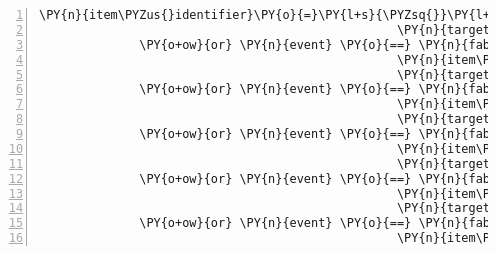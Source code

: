 \begin{Verbatim}[commandchars=\\\{\},numbers=left,firstnumber=1,stepnumber=1]
                                                  \PY{n}{item\PYZus{}identifier}\PY{o}{=}\PY{l+s}{\PYZsq{}}\PY{l+s}{goblet}\PY{l+s}{\PYZsq{}}\PY{p}{,}
                                                  \PY{n}{target\PYZus{}identifier}\PY{o}{=}\PY{l+s}{\PYZsq{}}\PY{l+s}{teleport\PYZus{}room\PYZus{}kuni}\PY{l+s}{\PYZsq{}}\PY{p}{)}
              \PY{o+ow}{or} \PY{n}{event} \PY{o}{==} \PY{n}{fabula}\PY{o}{.}\PY{n}{TriesToDropEvent}\PY{p}{(}\PY{n}{identifier}\PY{o}{=}\PY{n}{ID\PYZus{}KUNI}\PY{p}{,}
                                                  \PY{n}{item\PYZus{}identifier}\PY{o}{=}\PY{l+s}{\PYZsq{}}\PY{l+s}{goblet\PYZus{}filled}\PY{l+s}{\PYZsq{}}\PY{p}{,}
                                                  \PY{n}{target\PYZus{}identifier}\PY{o}{=}\PY{l+s}{\PYZsq{}}\PY{l+s}{teleport\PYZus{}room\PYZus{}cassandra}\PY{l+s}{\PYZsq{}}\PY{p}{)}
              \PY{o+ow}{or} \PY{n}{event} \PY{o}{==} \PY{n}{fabula}\PY{o}{.}\PY{n}{TriesToDropEvent}\PY{p}{(}\PY{n}{identifier}\PY{o}{=}\PY{n}{ID\PYZus{}KUNI}\PY{p}{,}
                                                  \PY{n}{item\PYZus{}identifier}\PY{o}{=}\PY{l+s}{\PYZsq{}}\PY{l+s}{goblet\PYZus{}filled}\PY{l+s}{\PYZsq{}}\PY{p}{,}
                                                  \PY{n}{target\PYZus{}identifier}\PY{o}{=}\PY{l+s}{\PYZsq{}}\PY{l+s}{teleport\PYZus{}room\PYZus{}kuni}\PY{l+s}{\PYZsq{}}\PY{p}{)}
              \PY{o+ow}{or} \PY{n}{event} \PY{o}{==} \PY{n}{fabula}\PY{o}{.}\PY{n}{TriesToDropEvent}\PY{p}{(}\PY{n}{identifier}\PY{o}{=}\PY{n}{ID\PYZus{}KUNI}\PY{p}{,}
                                                  \PY{n}{item\PYZus{}identifier}\PY{o}{=}\PY{l+s}{\PYZsq{}}\PY{l+s}{dew}\PY{l+s}{\PYZsq{}}\PY{p}{,}
                                                  \PY{n}{target\PYZus{}identifier}\PY{o}{=}\PY{l+s}{\PYZsq{}}\PY{l+s}{teleport\PYZus{}room\PYZus{}cassandra}\PY{l+s}{\PYZsq{}}\PY{p}{)}
              \PY{o+ow}{or} \PY{n}{event} \PY{o}{==} \PY{n}{fabula}\PY{o}{.}\PY{n}{TriesToDropEvent}\PY{p}{(}\PY{n}{identifier}\PY{o}{=}\PY{n}{ID\PYZus{}KUNI}\PY{p}{,}
                                                  \PY{n}{item\PYZus{}identifier}\PY{o}{=}\PY{l+s}{\PYZsq{}}\PY{l+s}{dew}\PY{l+s}{\PYZsq{}}\PY{p}{,}
                                                  \PY{n}{target\PYZus{}identifier}\PY{o}{=}\PY{l+s}{\PYZsq{}}\PY{l+s}{teleport\PYZus{}room\PYZus{}kuni}\PY{l+s}{\PYZsq{}}\PY{p}{)}
              \PY{o+ow}{or} \PY{n}{event} \PY{o}{==} \PY{n}{fabula}\PY{o}{.}\PY{n}{TriesToDropEvent}\PY{p}{(}\PY{n}{identifier}\PY{o}{=}\PY{n}{ID\PYZus{}KUNI}\PY{p}{,}
                                                  \PY{n}{item\PYZus{}identifier}\PY{o}{=}\PY{l+s}{\PYZsq{}}\PY{l+s}{string\PYZus{}harp}\PY{l+s}{\PYZsq{}}\PY{p}{,}

\end{Verbatim}

